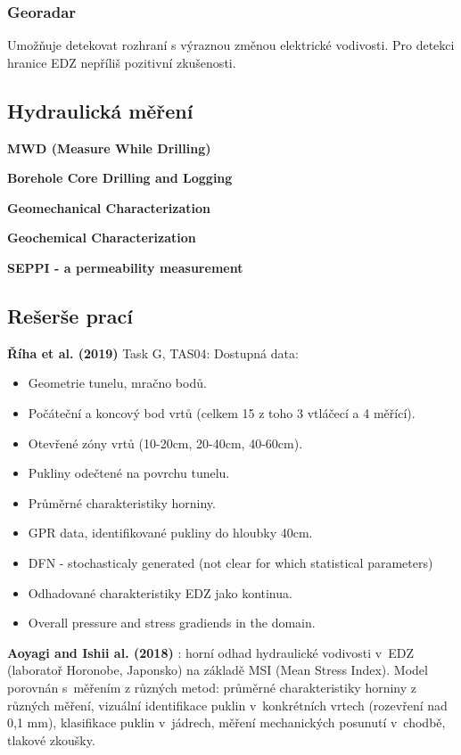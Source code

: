 \documentclass{article}
\begin{document}
\subsubsection{Georadar}
Umožňuje detekovat rozhraní s výraznou změnou elektrické vodivosti. Pro detekci hranice EDZ nepříliš pozitivní zkušenosti.

\subsection{Hydraulická měření}
    
  
{\bf MWD (Measure While Drilling)} \cite{JeroenvanEldert2018}


{\bf  Borehole Core Drilling and Logging} \cite{Lanyon2011}

{\bf  Geomechanical Characterization} \cite{Lanyon2011}

{\bf  Geochemical Characterization} \cite{Lanyon2011}

{\bf SEPPI - a permeability measurement} \cite{Rutqvist2009} 


\subsection{Rešerše prací}

{\bf Říha et al. (2019)} Task G, TAS04: Dostupná data: 
\begin{itemize}
    \item Geometrie tunelu, mračno bodů.
    \item Počáteční a koncový bod vrtů (celkem 15 z toho 3 vtláčecí a 4 měřící).
    \item Otevřené zóny vrtů (10-20cm, 20-40cm, 40-60cm).
    \item Pukliny odečtené na povrchu tunelu.
    \item Průměrné charakteristiky horniny.
    \item GPR data, identifikované pukliny do hloubky 40cm.
    \item DFN - stochasticaly generated (not clear for which statistical parameters)
    \item Odhadované charakteristiky EDZ jako kontinua.
    \item Overall pressure and stress gradiends in the domain.
\end{itemize}

{\bf Aoyagi and Ishii al. (2018)} \cite{Aoyagi2018}: horní odhad hydraulické vodivosti v~EDZ (laboratoř Horonobe, Japonsko) na základě MSI (Mean Stress Index). Model porovnán s~měřením z různých metod: průměrné charakteristiky horniny z různých měření, vizuální identifikace puklin v~konkrétních vrtech (rozevření nad 0,1 mm), klasifikace puklin v~jádrech, měření mechanických posunutí v~chodbě, tlakové zkoušky.
\end{document}
